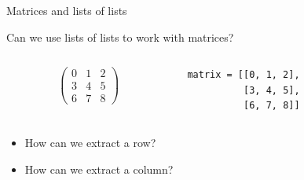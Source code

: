 \documentclass[svgnames]{beamer}
\begin{document}
\begin{frame}[fragile, t]{Matrices and lists of lists}
 
 \vspace{0.3truecm}
 Can we use lists of lists to work with matrices?

 \begin{columns}
  \begin{column}{0.4\textwidth}
   \begin{displaymath}
    \begin{pmatrix}
     0 & 1 & 2\\
     3 & 4 & 5\\
     6 & 7 & 8
    \end{pmatrix}
   \end{displaymath}
  \end{column}%
  \begin{column}{0.6\textwidth}
   \begin{center}
    \begin{lstlisting}
matrix = [[0, 1, 2],
          [3, 4, 5],
          [6, 7, 8]]
    \end{lstlisting}

    \vspace{\baselineskip}
   \end{center}
  \end{column}
 \end{columns}
 \begin{itemize}
  \item How can we extract a row? 
  \item How can we extract a column? 
 \end{itemize}

 \vspace{0.3truecm}
 \begin{center}
 \end{center}
\end{frame}
\end{document}
